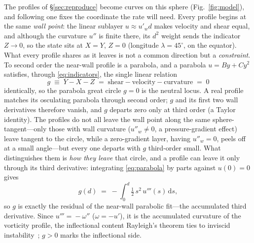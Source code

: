 \documentclass[journal]{new-aiaa}
\begin{document}
The profiles of \S\ref{sec:reproduce} become curves on this sphere
(Fig.~\ref{fig:model}), and following one fixes the coordinate the rate will
need. Every profile begins at the same \emph{wall point}: the linear sublayer
$u\!\approx\!u'_w d$ makes velocity and shear equal, and although the curvature
$u''$ is finite there, its $d^2$ weight sends the indicator $Z\!\to\!0$, so the
state sits at $X\!=\!Y$, $Z\!=\!0$ (longitude $\lambda\!=\!45^\circ$, on the
equator). What every profile shares as it leaves is not a common direction but a
\emph{constraint}. To second order the near-wall profile is a parabola, and a
parabola $u=By+Cy^2$ satisfies, through \eqref{eq:indicators}, the single linear
relation
\begin{equation}
  g \;\equiv\; Y - X - Z \;=\; \text{shear}-\text{velocity}-\text{curvature} \;=\; 0
  \label{eq:parabola}
\end{equation}
identically, so the parabola great circle $g=0$ is the neutral locus. A real
profile matches its osculating parabola through second order; $g$ and its first
two wall derivatives therefore vanish, and $g$ departs zero only at third order
(a Taylor identity). The profiles do not all leave the wall point along the same
sphere-tangent---only those with wall curvature ($u''_w\!\neq\!0$, a
pressure-gradient effect) leave tangent to the circle, while a zero-gradient
layer, having $u''_w\!=\!0$, peels off at a small angle---but every one departs
with $g$ third-order small. What distinguishes them is \emph{how they leave} that circle,
and a profile can leave it only through its third derivative: integrating
\eqref{eq:parabola} by parts against $u(0)=0$ gives
\begin{equation}
  g(d) \;=\; -\int_0^d \tfrac12\,s^2\,u'''(s)\,\mathrm{d}s ,
  \label{eq:g_integral}
\end{equation}
so $g$ is exactly the residual of the near-wall parabolic fit---the accumulated
third derivative. Since $u'''\!=\!-\omega''$ ($\omega=-u'$), it is the
accumulated curvature of the vorticity profile, the inflectional content
Rayleigh's theorem ties to inviscid instability~\cite{schmid_henningson_2001};
$g>0$ marks the inflectional side.
\end{document}
